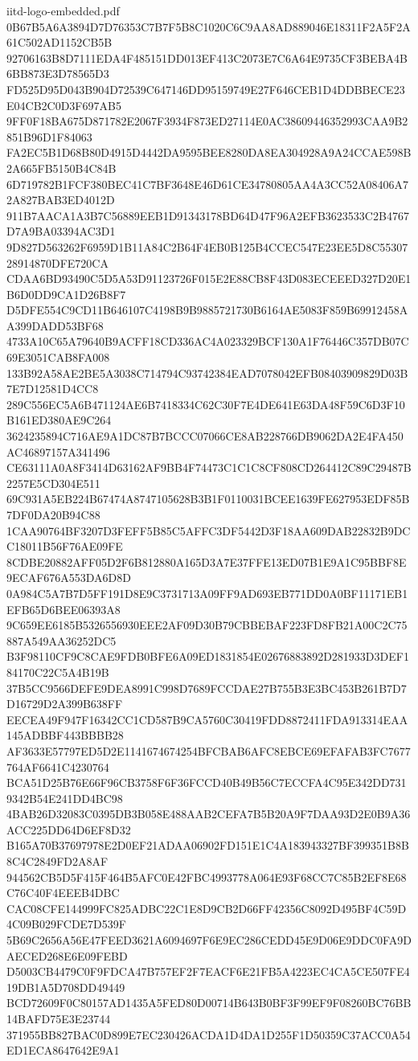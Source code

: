 \begin{filecontents*}[overwrite]{iitd-logo-embedded.pdf}
0B67B5A6A3894D7D76353C7B7F5B8C1020C6C9AA8AD889046E18311F2A5F2A61C502AD1152CB5B
92706163B8D7111EDA4F485151DD013EF413C2073E7C6A64E9735CF3BEBA4B6BB873E3D78565D3
FD525D95D043B904D72539C647146DD95159749E27F646CEB1D4DDBBECE23E04CB2C0D3F697AB5
9FF0F18BA675D871782E2067F3934F873ED27114E0AC38609446352993CAA9B2851B96D1F84063
FA2EC5B1D68B80D4915D4442DA9595BEE8280DA8EA304928A9A24CCAE598B2A665FB5150B4C84B
6D719782B1FCF380BEC41C7BF3648E46D61CE34780805AA4A3CC52A08406A72A827BAB3ED4012D
911B7AACA1A3B7C56889EEB1D91343178BD64D47F96A2EFB3623533C2B4767D7A9BA03394AC3D1
9D827D563262F6959D1B11A84C2B64F4EB0B125B4CCEC547E23EE5D8C5530728914870DFE720CA
CDAA6BD93490C5D5A53D91123726F015E2E88CB8F43D083ECEEED327D20E1B6D0DD9CA1D26B8F7
D5DFE554C9CD11B646107C4198B9B9885721730B6164AE5083F859B69912458AA399DADD53BF68
4733A10C65A79640B9ACFF18CD336AC4A023329BCF130A1F76446C357DB07C69E3051CAB8FA008
133B92A58AE2BE5A3038C714794C93742384EAD7078042EFB08403909829D03B7E7D12581D4CC8
289C556EC5A6B471124AE6B7418334C62C30F7E4DE641E63DA48F59C6D3F10B161ED380AE9C264
3624235894C716AE9A1DC87B7BCCC07066CE8AB228766DB9062DA2E4FA450AC46897157A341496
CE63111A0A8F3414D63162AF9BB4F74473C1C1C8CF808CD264412C89C29487B2257E5CD304E511
69C931A5EB224B67474A8747105628B3B1F0110031BCEE1639FE627953EDF85B7DF0DA20B94C88
1CAA90764BF3207D3FEFF5B85C5AFFC3DF5442D3F18AA609DAB22832B9DCC18011B56F76AE09FE
8CDBE20882AFF05D2F6B812880A165D3A7E37FFE13ED07B1E9A1C95BBF8E9ECAF676A553DA6D8D
0A984C5A7B7D5FF191D8E9C3731713A09FF9AD693EB771DD0A0BF11171EB1EFB65D6BEE06393A8
9C659EE6185B5326556930EEE2AF09D30B79CBBEBAF223FD8FB21A00C2C75887A549AA36252DC5
B3F98110CF9C8CAE9FDB0BFE6A09ED1831854E02676883892D281933D3DEF184170C22C5A4B19B
37B5CC9566DEFE9DEA8991C998D7689FCCDAE27B755B3E3BC453B261B7D7D16729D2A399B638FF
EECEA49F947F16342CC1CD587B9CA5760C30419FDD8872411FDA913314EAA145ADBBF443BBBB28
AF3633E57797ED5D2E1141674674254BFCBAB6AFC8EBCE69EFAFAB3FC7677764AF6641C4230764
BCA51D25B76E66F96CB3758F6F36FCCD40B49B56C7ECCFA4C95E342DD7319342B54E241DD4BC98
4BAB26D32083C0395DB3B058E488AAB2CEFA7B5B20A9F7DAA93D2E0B9A36ACC225DD64D6EF8D32
B165A70B37697978E2D0EF21ADAA06902FD151E1C4A183943327BF399351B8B8C4C2849FD2A8AF
944562CB5D5F415F464B5AFC0E42FBC4993778A064E93F68CC7C85B2EF8E68C76C40F4EEEB4DBC
CAC08CFE144999FC825ADBC22C1E8D9CB2D66FF42356C8092D495BF4C59D4C09B029FCDE7D539F
5B69C2656A56E47FEED3621A6094697F6E9EC286CEDD45E9D06E9DDC0FA9DAECED268E6E09FEBD
D5003CB4479C0F9FDCA47B757EF2F7EACF6E21FB5A4223EC4CA5CE507FE419DB1A5D708DD49449
BCD72609F0C80157AD1435A5FED80D00714B643B0BF3F99EF9F08260BC76BB14BAFD75E3E23744
371955BB827BAC0D899E7EC230426ACDA1D4DA1D255F1D50359C37ACC0A54ED1ECA8647642E9A1

\end{filecontents*}
